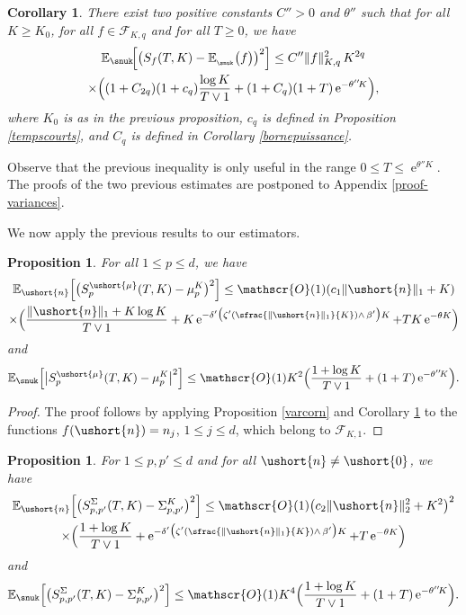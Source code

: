 \documentclass[10pt]{amsart}
\newcommand{\Psfrac}[2]{(\sfrac{#1}{#2})}
\newcommand{\scaleto}[2]{#1}
\let\mathcal\mathscr
\numberwithin{equation}{section}
\theoremstyle{plain}
\newtheorem{proposition}[theorem]{Proposition}
\newtheorem{corollary}[theorem]{Corollary}
\theoremstyle{definition}
\newcommand{\E}{{\mathbb{E}}}
\newcommand{\Oun}{\mathcal{O}(1)}
\newcommand{\sK}{K}
\newcommand{\vecn}{\ushort{n}}
\newcommand{\vmu}{\ushort{\mu}}
\newcommand{\veczer}{\ushort{0}}
\newcommand{\e}{\operatorname{e}}
\newcommand{\norm}[1]{\|#1\|_{1}}\let\snorm\norm
\newcommand{\normdeux}[1]{\|#1\|_{2}}\let\snormdeux\normdeux
\begin{document}
\begin{corollary}\label{varcornu}
There exist two positive constants $C''>0$ and $\theta''$ such that
for all $K\geq K_0$, for all $f\in\mathscr{F}\!_{\sK,q}$ and for all $T\geq 0$, we have
\begin{multline*}
\E_{\snuk}\!\Bigl[\bigl(S_{f}(T,K)-\E_{_{\snuk}}\bigl(f\bigr)\bigr)^2\Bigr]\leq C'' \|f\|_{\sK,q}^2\, K^{2q}\\
\times \Bigl((1+C_{2q})(1+c_q)\frac{\log K}{T\vee 1}+ (1+C_q)(1+T) \e^{-\theta'' \! K} \Bigr),
\end{multline*}
where $K_0$ is as in the previous proposition, $c_q$ is defined in Proposition \ref{tempscourts}, and $C_q$ is defined in
Corollary \ref{bornepuissance}.
\end{corollary}
Observe that the previous inequality is only useful in the range $0\leq T \le \e^{\theta'' \! K}$.
The proofs of the two previous estimates are postponed to Appendix \ref{proof-variances}.

We now apply the previous results to our estimators.

\begin{proposition}
For all $1\leq p\leq d$, we have
\begin{multline*}
\E_{\vecn}\Bigl[\bigl(S^{\vmu}_p(T,K)-\mu_p^{\sK}\bigr)^2\Bigr]\le \Oun(c_1\norm{\vecn} +K)\\
\times
\Bigl(\frac{\norm{\vecn} +K \log K}{T\vee 1}+ K\e^{-\delta'\bigl(\zeta' \Psfrac{\|\vecn\|_{1}}{K}\wedge\, \beta'\bigr)K} + T K\e^{-\theta K} \Bigr)
\end{multline*}
and
\[
\E_{\snuk}\Bigl[\big|S^{\vmu}_p(T,K)-\mu_p^{\sK}\big|^2\Bigr]\le
\Oun K^2 \Bigl(\frac{1+\log K}{T\vee 1}+(1+T) \e^{-\theta''\! K} \Bigr).
\]
\end{proposition}

\begin{proof}
The proof follows by applying Proposition \ref{varcorn} and Corollary \ref{varcornu} to the functions $f(\vecn)=n_j$, $1\leq j\leq d$, which belong to $\mathscr{F}\!_{\sK,\scaleto{1}{4pt}}$.
\end{proof}

\begin{proposition}
\label{vs2}
For $1\leq p,p'\leq d$ and for all $\vecn\neq \veczer$, we have
\begin{multline*}
\E_{\vecn}\Bigl[\bigl(S^{{ \Sigma}}_{p,p'}(T,K)-\Sigma_{p,p'}^{\sK}\bigr)^2\Bigr]\le
\Oun \bigl(c_{2}\normdeux{\vecn}^{\scaleto{2}{3.5pt}} +K^2\bigr)^2\\ \times
\Bigl(
\frac{1+\log K}{T\vee 1}+ \e^{-\delta'\bigl(\zeta' \Psfrac{\|\vecn\|_{1}}{K}\wedge\, \beta'\bigr)K} + T \e^{-\theta K}
\Bigr)
\end{multline*}
and
\[
\E_{\snuk}\!\left[\bigl(S^{{ \Sigma}}_{p,p'}(T,K)-\Sigma_{p,p'}^{\sK}\bigr)^2\right]
\le \Oun K^{\scaleto{4}{4pt}} \Bigl(\frac{1+\log K}{T\vee 1}+(1+T) \e^{-\theta'' \!K} \Bigr).
\]
\end{proposition}
\end{document}
